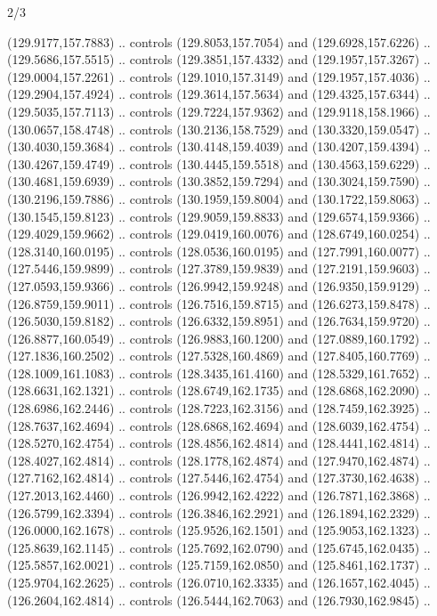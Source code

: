 \begin{flagdescription}{2/3}
\begin{scope}[shift={(0.5\flaglength,0.5)},scale=\flagwidth/320]
\begin{scope}[y=0.8pt, x=0.8pt, yscale=-1,shift={(-118.3,-146)}]
  (129.9177,157.7883) .. controls (129.8053,157.7054) and (129.6928,157.6226) ..
  (129.5686,157.5515) .. controls (129.3851,157.4332) and (129.1957,157.3267) ..
  (129.0004,157.2261) .. controls (129.1010,157.3149) and (129.1957,157.4036) ..
  (129.2904,157.4924) .. controls (129.3614,157.5634) and (129.4325,157.6344) ..
  (129.5035,157.7113) .. controls (129.7224,157.9362) and (129.9118,158.1966) ..
  (130.0657,158.4748) .. controls (130.2136,158.7529) and (130.3320,159.0547) ..
  (130.4030,159.3684) .. controls (130.4148,159.4039) and (130.4207,159.4394) ..
  (130.4267,159.4749) .. controls (130.4445,159.5518) and (130.4563,159.6229) ..
  (130.4681,159.6939) .. controls (130.3852,159.7294) and (130.3024,159.7590) ..
  (130.2196,159.7886) .. controls (130.1959,159.8004) and (130.1722,159.8063) ..
  (130.1545,159.8123) .. controls (129.9059,159.8833) and (129.6574,159.9366) ..
  (129.4029,159.9662) .. controls (129.0419,160.0076) and (128.6749,160.0254) ..
  (128.3140,160.0195) .. controls (128.0536,160.0195) and (127.7991,160.0077) ..
  (127.5446,159.9899) .. controls (127.3789,159.9839) and (127.2191,159.9603) ..
  (127.0593,159.9366) .. controls (126.9942,159.9248) and (126.9350,159.9129) ..
  (126.8759,159.9011) .. controls (126.7516,159.8715) and (126.6273,159.8478) ..
  (126.5030,159.8182) .. controls (126.6332,159.8951) and (126.7634,159.9720) ..
  (126.8877,160.0549) .. controls (126.9883,160.1200) and (127.0889,160.1792) ..
  (127.1836,160.2502) .. controls (127.5328,160.4869) and (127.8405,160.7769) ..
  (128.1009,161.1083) .. controls (128.3435,161.4160) and (128.5329,161.7652) ..
  (128.6631,162.1321) .. controls (128.6749,162.1735) and (128.6868,162.2090) ..
  (128.6986,162.2446) .. controls (128.7223,162.3156) and (128.7459,162.3925) ..
  (128.7637,162.4694) .. controls (128.6868,162.4694) and (128.6039,162.4754) ..
  (128.5270,162.4754) .. controls (128.4856,162.4814) and (128.4441,162.4814) ..
  (128.4027,162.4814) .. controls (128.1778,162.4874) and (127.9470,162.4874) ..
  (127.7162,162.4814) .. controls (127.5446,162.4754) and (127.3730,162.4638) ..
  (127.2013,162.4460) .. controls (126.9942,162.4222) and (126.7871,162.3868) ..
  (126.5799,162.3394) .. controls (126.3846,162.2921) and (126.1894,162.2329) ..
  (126.0000,162.1678) .. controls (125.9526,162.1501) and (125.9053,162.1323) ..
  (125.8639,162.1145) .. controls (125.7692,162.0790) and (125.6745,162.0435) ..
  (125.5857,162.0021) .. controls (125.7159,162.0850) and (125.8461,162.1737) ..
  (125.9704,162.2625) .. controls (126.0710,162.3335) and (126.1657,162.4045) ..
  (126.2604,162.4814) .. controls (126.5444,162.7063) and (126.7930,162.9845) ..

\end{scope}
\end{scope}
\end{flagdescription}
